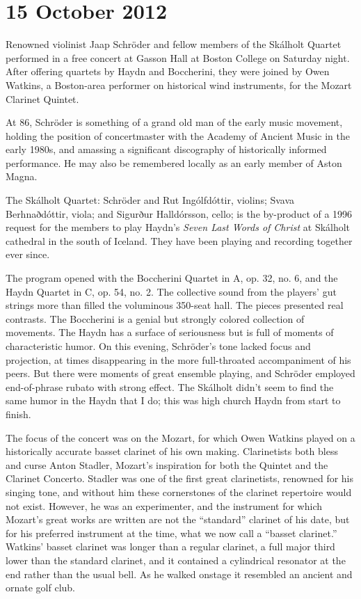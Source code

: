 \chapter{15 October 2012}

Renowned violinist Jaap Schröder  and fellow members of the  Skálholt Quartet performed in a free concert at Gasson Hall at Boston College on Saturday night. After offering quartets by Haydn and Boccherini, they were joined by Owen Watkins, a Boston-area performer on historical wind instruments, for the Mozart Clarinet Quintet.

At 86, Schröder is something of a grand old man of the early music movement, holding the position of concertmaster with the Academy of Ancient Music in the early 1980s, and amassing a significant discography of historically informed performance. He may also be remembered locally as an early member of Aston Magna.

The Skálholt Quartet: Schröder and Rut Ingólfdóttir, violins; Svava Berhnaðdóttir, viola; and Sigurður Halldórsson, cello; is the by-product of a 1996 request for the members to play Haydn’s \textit{Seven Last Words of Christ} at Skálholt cathedral in the south of Iceland. They have been playing and recording together ever since.

The program opened with the Boccherini Quartet in A, op. 32, no. 6, and the Haydn Quartet in C, op. 54, no. 2. The collective sound from the players’ gut strings more than filled the voluminous 350-seat hall. The pieces presented real contrasts. The Boccherini is a genial but strongly colored collection of movements. The Haydn has a surface of seriousness but is full of moments of characteristic humor. On this evening, Schröder’s tone lacked focus and projection, at times disappearing in the more full-throated accompaniment of his peers. But there were moments of great ensemble playing, and Schröder employed end-of-phrase rubato with strong effect. The Skálholt didn’t seem to find the same humor in the Haydn that I do; this was high church Haydn from start to finish.

The focus of the concert was on the Mozart, for which Owen Watkins played on a historically accurate basset clarinet of his own making. Clarinetists both bless and curse Anton Stadler, Mozart’s inspiration for both the Quintet and the Clarinet Concerto. Stadler was one of the first great clarinetists, renowned for his singing tone, and without him these cornerstones of the clarinet repertoire would not exist. However, he was an experimenter, and the instrument for which Mozart’s great works are written are not the “standard” clarinet of his date, but for his preferred instrument at the time, what we now call a “basset clarinet.” Watkins’ basset clarinet was longer than a regular clarinet, a full major third lower than the standard clarinet, and it contained a cylindrical resonator at the end rather than the usual bell. As he walked onstage it resembled an ancient and ornate golf club.

